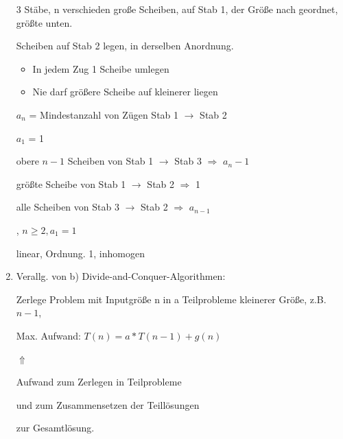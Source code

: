 \begin{enumerate}
	 3 Stäbe, n verschieden große Scheiben, auf Stab 1, der Größe nach geordnet, größte unten.
	 
	 Scheiben auf Stab 2 legen, in derselben Anordnung.
	 \begin{itemize}
	 	\item In jedem Zug 1 Scheibe umlegen
	 	\item Nie darf größere Scheibe auf kleinerer liegen
	 \end{itemize}
	 $a_n$ = Mindestanzahl von Zügen Stab 1 $\rightarrow$ Stab 2
	 
	 $a_1$ = 1
	 
	 obere $n-1$ Scheiben von Stab 1 $\rightarrow$ Stab 3 $\Rightarrow$ $a_n-1$ 
	 
	 größte Scheibe von Stab 1 $\rightarrow$ Stab 2 $\Rightarrow$ 1 
	 
	 alle Scheiben von Stab 3 $\rightarrow$ Stab 2 $\Rightarrow$ $a_{n-1}$ 
	 
	 , $n\geq2, a_1 = 1$ 
	 
	 linear, Ordnung. 1, inhomogen
	 
	 \item Verallg. von b) Divide-and-Conquer-Algorithmen:
	 
	 Zerlege Problem mit Inputgröße n in a Teilprobleme kleinerer Größe, z.B. $n - 1$,
	 
	 Max. Aufwand: $T(n) = a*T(n-1)+g(n)$
	 
	 
	 \qquad   \qquad \qquad \qquad  \qquad  \qquad \qquad \qquad$\Uparrow$

	 \qquad   \qquad \qquad  \qquad  \qquad \qquad \qquad Aufwand zum Zerlegen in Teilprobleme
	 
	 \qquad   \qquad \qquad  \qquad  \qquad \qquad \qquad und zum Zusammensetzen der Teillösungen
	 
	 \qquad   \qquad \qquad  \qquad  \qquad \qquad \qquad zur Gesamtlösung.
	 
	 
\end{enumerate}